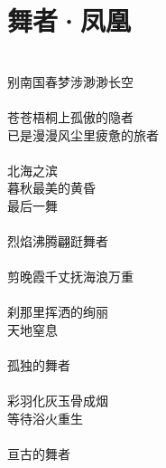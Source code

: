 \section{舞者·凤凰}
\leftskip=30mm
\noindent \\
别南国春梦\fspace 涉渺渺长空\\
\\
苍苍梧桐上孤傲的隐者\\
已是漫漫风尘里疲惫的旅者\\
\\
北海之滨\\
暮秋最美的黄昏\\
最后一舞\\
\\
烈焰沸腾\fspace 翩跹舞者\\
\\
剪晚霞千丈\fspace 抚海浪万重\\
\\
刹那里挥洒的绚丽\\
天地窒息\\
\\
孤独的舞者\\
\\
彩羽化灰\fspace 玉骨成烟\\
等待浴火重生\\
\\
亘古的舞者
